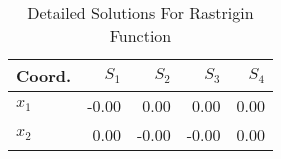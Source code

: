 \begin{table}[H]
\centering
\caption{Detailed Solutions For Rastrigin Function}
\label{detailedsolutions:rastrigin2d}
\begin{tabular}{lrrrr}
\toprule
 Coord. &  $S_{1}$ &  $S_{2}$ &  $S_{3}$ &  $S_{4}$ \\
\midrule
$x_{1}$ &    -0.00 &     0.00 &     0.00 &     0.00 \\
$x_{2}$ &     0.00 &    -0.00 &    -0.00 &     0.00 \\
\bottomrule
\end{tabular}
\end{table}
